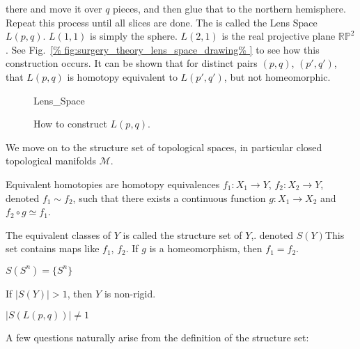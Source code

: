 \documentclass[crop=false,class=book,oneside]{standalone}
\begin{document}
            there and move it over $q$ pieces, and then glue
            that to the northern hemisphere. Repeat this
            process until all slices are done. The is called
            the Lens Space $L(p,q)$. $L(1,1)$ is simply the
            sphere. $L(2,1)$ is the real projective plane
            $\mathbb{RP}^{2}$.
            See Fig.~\ref{%
                fig:surgery_theory_lens_space_drawing%
            }
            to see how this construction occurs.
            It can be shown that for distinct pairs
            $(p,q)$, $(p',q')$, that $L(p,q)$ is homotopy
            equivalent to $L(p',q')$, but not homeomorphic.
            \begin{figure}[H]
                \centering
                \captionsetup{type=figure}
                {Lens_Space}
                \caption{How to construct $L(p,q)$.}
                \label{fig:surgery_theory_lens_space_drawing}
            \end{figure}
            We move on to the structure set of topological spaces,
            in particular closed topological
            manifolds $\mathcal{M}$.
            \begin{definition}
                    Equivalent homotopies are homotopy equivalences
                    $f_{1}:X_{1}\rightarrow Y$,
                    $f_{2}:X_{2}\rightarrow Y$,
                    denoted $f_{1}\sim{f_{2}}$, such that there
                    exists a continuous function
                    $g:X_{1}\rightarrow{X_{2}}$ and
                    $f_{2}\circ{g}\simeq{f_{1}}$.
                \end{definition}
            The equivalent classes of $Y$ is called the
            structure set of $Y$,.
            denoted $S(Y)$This set contains maps
            like $f_{1}$, $f_{2}$.
            If $g$ is a homeomorphism, then $f_{1}=f_{2}$.
            \begin{example}
                    $S(S^{n})=\{S^{n}\}$
                \end{example}
            If $|S(Y)|>1$, then $Y$ is non-rigid.
            \begin{example}
                    $|S(L(p,q))|\ne{1}$
                \end{example}
            A few questions naturally arise from the
            definition of the structure set:
\end{document}
